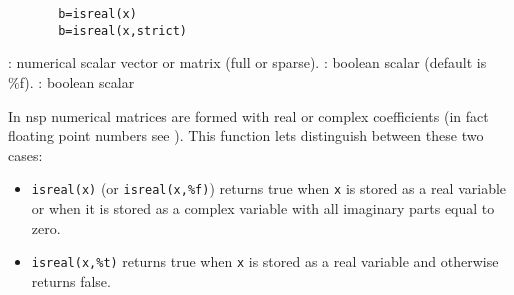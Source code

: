 


\begin{mandesc}
\end{mandesc}


\begin{calling_sequence}
    \begin{verbatim}
       b=isreal(x)  
       b=isreal(x,strict)  
    \end{verbatim}
\end{calling_sequence}

\begin{parameters}
  \begin{varlist}
    : numerical scalar vector or matrix (full or sparse).
    : boolean scalar (default is \%f).
    : boolean scalar
  \end{varlist}
\end{parameters}

\begin{mandescription}
In nsp numerical matrices are formed with real or complex coefficients
(in fact floating point numbers see
). This function
lets distinguish between these two cases:
\begin{itemize}
\item \verb!isreal(x)! (or \verb!isreal(x,%f)!) returns true when 
\verb!x! is stored as a real variable or when it is stored 
as a complex variable with all imaginary parts equal to zero. 
\item \verb!isreal(x,%t)! returns true when \verb!x! is stored as a real
variable and otherwise returns false.
\end{itemize}

\end{mandescription}

\begin{examples}

\begin{program}
\end{program}

\end{examples}

